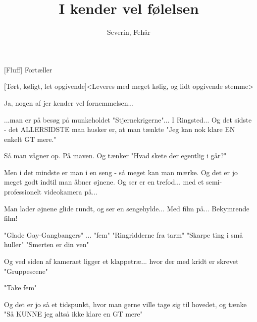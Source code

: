 \documentclass[a4paper,11pt]{article}
\title{I kender vel følelsen}
\author{Severin, Fehår}
\begin{document}
\maketitle

\begin{roles}
[Fluff] Fortæller
\end{roles}

\begin{props}
\end{props}

  
\begin{sketch}

[Tørt, køligt, let opgivende]<Leveres med meget kølig, og lidt opgivende stemme>

Ja, nogen af jer kender vel fornemmelsen...


...man er på besøg på munkeholdet "Stjernekrigerne"... I Ringsted...
Og det sidste - det ALLERSIDSTE man husker er, at man tænkte "Jeg kan
nok klare EN enkelt GT mere."


Så man vågner op. På maven. Og tænker "Hvad skete der egentlig i går?"


Men i det mindste er man i en seng - så meget kan man mærke. Og det er
jo meget godt indtil man åbner øjnene. Og ser er en trefod... med et
semi-professionelt videokamera på...


Man lader øjnene glide rundt, og ser en sengehylde... Med film på...
Bekymrende film!


"Glade Gay-Gangbangers" ... "fem" "Ringridderne fra tarm"
 "Skarpe ting i små huller"  "Smerten er din ven"

Og ved siden af kameraet ligger et klappetræ... hvor der med kridt er
skrevet "Gruppescene"


"Take fem"


Og det er jo så et tidspunkt, hvor man gerne ville tage sig til
hovedet, og tænke "Så KUNNE jeg altså ikke klare en GT mere"


\end{sketch}
\end{document}

